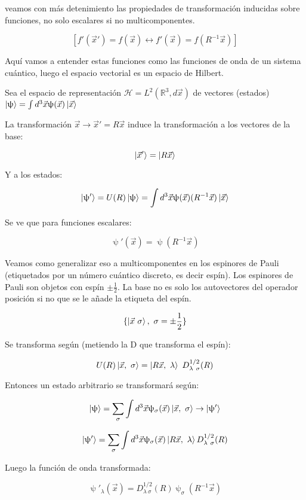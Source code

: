 \documentclass{article}
\begin{document}
        veamos con más detenimiento las propiedades de transformación inducidas sobre funciones, no solo escalares si no multicomponentes.

        $$[f'(\Vec{x}')=f(\Vec{x}) \leftrightarrow f'(\Vec{x})=f(R^{-1}\Vec{x})]$$

        Aquí vamos a entender estas funciones como las funciones de onda de un sistema cuántico, luego el espacio vectorial es un espacio de Hilbert.

        \smallskip
        Sea el espacio de representación $\mathcal{H}=L^2(\mathds{R}^3,d\Vec{x})$ de vectores (estados) $\ket{\uppsi}=\int d^3\Vec{x} \uppsi (\Vec{x})\ket{\Vec{x}}$

        La transformación $\Vec{x} \to \Vec{x}'=R\Vec{x}$ induce la transformación a los vectores de la base:

        $$\ket{\Vec{x}'}=\ket{R\Vec{x}}$$

        Y a los estados:

        $$\ket{\uppsi '}=U(R)\ket{\uppsi}=\int d^3\Vec{x} \uppsi (\Vec{x})(R^{-1}\Vec{x})\ket{\Vec{x}}$$

        Se ve que para funciones escalares:

        $$\uppsi '(\Vec{x})=\uppsi (R^{-1}\Vec{x})$$


         Veamos como generalizar eso a multicomponentes en los espinores de Pauli (etiquetados por un número cuántico discreto, es decir espín). Los espinores de Pauli son objetos con espín $\pm \frac{1}{2}$. La base no es solo los autovectores del operador posición si no que se le añade la etiqueta del espín.

         $$\{ \ket{\Vec{x} \ \sigma},  \ \sigma = \pm \frac{1}{2}\}$$

        Se transforma según (metiendo la D que transforma el espín):

        $$U(R)\ket{\Vec{x}, \ \sigma} = \ket{R\Vec{x}, \ \lambda} \ D_{\lambda \ \sigma}^{1/2}(R)$$

        Entonces un estado arbitrario se transformará según:

        $$\ket{\uppsi} = \sum _\sigma \int d^3\Vec{x} \uppsi _\sigma (\Vec{x}) \ket{\Vec{x}, \ \sigma} \to \ket{\uppsi '}$$

        $$\ket{\uppsi '}= \sum _\sigma \int d^3\Vec{x} \uppsi _\sigma (\Vec{x})\ket{R\Vec{x}, \ \lambda} D_{\lambda \ \sigma}^{1/2} (R)$$

        Luego la función de onda transformada:

        $$\uppsi '_\lambda (\Vec{x})= D^{1/2}_{\lambda \ \sigma}(R) \uppsi _\sigma (R^{-1}\Vec{x})$$
\end{document}

